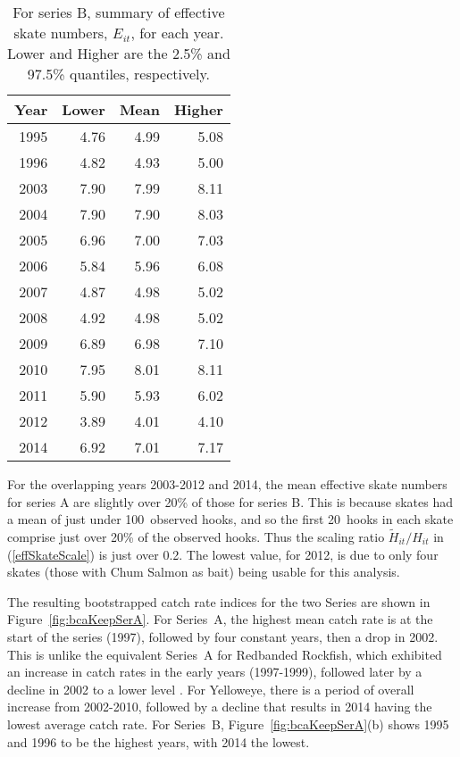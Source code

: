 \begin{table}[p]
\centering
\caption{For series B, summary of effective skate numbers, 
     $E_{it}$, for each
     year. Lower and Higher are the 2.5\% and 97.5\% quantiles, 
     respectively.} 
\label{tab:effSummB}
\begin{tabular}{rrrr}
  \hline
Year & Lower & Mean & Higher \\ 
  \hline
1995 & 4.76 & 4.99 & 5.08 \\ 
  1996 & 4.82 & 4.93 & 5.00 \\ 
  2003 & 7.90 & 7.99 & 8.11 \\ 
  2004 & 7.90 & 7.90 & 8.03 \\ 
  2005 & 6.96 & 7.00 & 7.03 \\ 
  2006 & 5.84 & 5.96 & 6.08 \\ 
  2007 & 4.87 & 4.98 & 5.02 \\ 
  2008 & 4.92 & 4.98 & 5.02 \\ 
  2009 & 6.89 & 6.98 & 7.10 \\ 
  2010 & 7.95 & 8.01 & 8.11 \\ 
  2011 & 5.90 & 5.93 & 6.02 \\ 
  2012 & 3.89 & 4.01 & 4.10 \\ 
  2014 & 6.92 & 7.01 & 7.17 \\ 
   \hline
\end{tabular}
\end{table}

For the overlapping years 2003-2012 and 2014, the mean effective skate numbers
for series A are slightly over 20\% of those for series B. This is because
skates had a mean of just under 100~observed hooks, and so the first 20~hooks in
each skate comprise just over 20\% of the observed hooks. Thus the scaling ratio
$\tilde{H}_{it} /H_{it}$ in (\ref{effSkateScale}) is just over 0.2.
The lowest value, for 2012, is due to only four skates (those with Chum Salmon
as bait) being usable for this analysis.

 

The resulting bootstrapped catch rate indices for the two Series are shown in
Figure~\ref{fig:bcaKeepSerA}. For Series~A, the highest mean catch rate is at
the start of the series (1997), followed by four constant years, then a drop in
2002. This is unlike the equivalent Series~A for Redbanded Rockfish, which
exhibited an increase in catch rates in the early years (1997-1999), followed
later by a decline in 2002 to a lower level \citep{ehs17}. For Yelloweye, there
is a period of overall increase from 2002-2010, followed by a decline that
results in 2014 having the lowest average catch rate. For Series~B,
Figure~\ref{fig:bcaKeepSerA}(b) shows 1995 and 1996 to be the highest years,
with 2014 the lowest.

